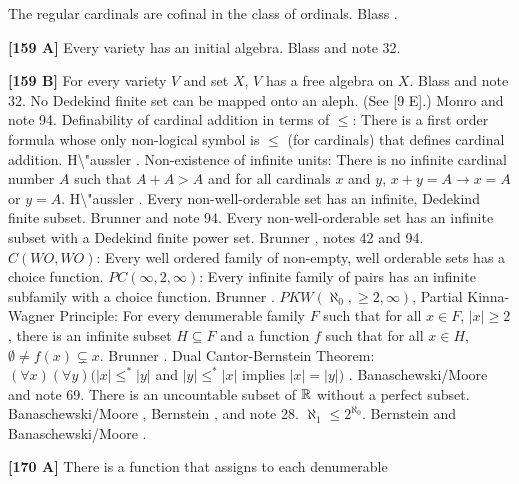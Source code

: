  The regular cardinals are cofinal in the class of
ordinals.  \ac{Blass} \cite{1983b}.
\smallskip
\item{}{\bf [159 A]} Every variety has an initial algebra. \ac{Blass}
\cite{1983b} and note 32.
\smallskip
\item{}{\bf [159 B]}  For every variety $V$ and set $X$, $V$ has a free
algebra on $X$.  \ac{Blass} \cite{1983b} and note 32.
\medskip
{} No Dedekind finite set can be mapped
onto an aleph. (See [9 E].)  \ac{Monro} \cite{1975} and note 94.
\medskip
{}  Definability of cardinal addition in terms of
$\le$: There is a first order formula whose only non-logical symbol is $\le$
(for cardinals) that defines cardinal addition. \ac{H\"aussler} \cite{1983}.
\medskip
{} Non-existence of infinite units: There is no
infinite cardinal number $A$ such that $A + A > A$  and for all cardinals
$x$ and $y$, $x + y = A\rightarrow x = A$ or $y = A$. \ac{H\"aussler}
\cite{1983}.
\medskip
{}  Every non-well-orderable set has an infinite,
Dedekind finite subset.  \ac{Brunner} \cite{1982a} and note 94.
\medskip
{} Every non-well-orderable set has an infinite subset
with a Dedekind finite power set. \ac{Brunner} \cite{1982a}, notes 42
and 94.
\medskip
{}  $C(WO,WO)$:  Every well ordered family of
non-empty, well orderable sets has a choice function.
\medskip
{} $PC(\infty,2,\infty)$: Every infinite family of
pairs has an infinite subfamily with a choice function. \ac{Brunner}
\cite{1982a}.
\medskip
{} $PKW(\aleph_{0},\ge 2,\infty)$, Partial
Kinna-Wagner Principle:  For every denumerable family $F$ such that for
all $x\in F$, $|x|\ge 2$, there is an infinite subset $H\subseteq F$ and
a function $f$ such that for all $x\in H$, $\emptyset\neq f(x)
\subsetneq x$. \ac{Brunner} \cite{1982a}.
\medskip
{}  Dual Cantor-Bernstein Theorem: $(\forall x)
(\forall y)(|x| \le^*|y|$ and $|y|\le^* |x|$ implies  $|x| = |y|)$ .
\ac{Banaschewski/Moore} \cite{1990} and note 69.
\medskip
{} There is an uncountable subset of ${\Bbb R}$
without a perfect subset. \ac{Banaschewski/Moore} \cite{1990},
\ac{Bernstein} \cite{1908}, and note 28.
\medskip
{} $\aleph_{1}\le 2^{\aleph_{0}}$. \ac{Bernstein}
\cite{1908} and \ac{Banaschewski/Moore} \cite{1990}.
\smallskip
\item{}{\bf [170 A]}  There is a function that assigns to each  denumerable
